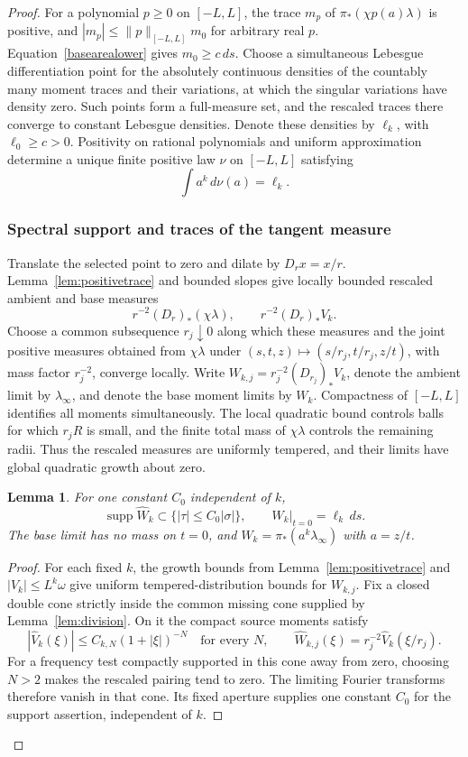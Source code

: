 \documentclass[11pt]{article}
\newtheorem{lemma}[theorem]{Lemma}
\newcommand{\supp}{\operatorname{supp}}
\begin{document}
\begin{proof}
For a polynomial $p\ge0$ on $[-L,L]$, the trace $m_p$ of $\pi_*(\chi p(a)\lambda)$ is positive, and
$|m_p|\le\|p\|_{[-L,L]}m_0$ for arbitrary real $p$. Equation~\eqref{basearealower} gives $m_0\ge c\,ds$. Choose a simultaneous Lebesgue differentiation point for the absolutely continuous densities of the countably many moment traces and their variations, at which the singular variations have density zero. Such points form a full-measure set, and the rescaled traces there converge to constant Lebesgue densities. Denote these densities by $\ell_k$, with $\ell_0\ge c>0$. Positivity on rational polynomials and uniform approximation determine a unique finite positive law $\nu$ on $[-L,L]$ satisfying
\begin{equation}\label{lawdefinition}
 \int a^k\,d\nu(a)=\ell_k.
\end{equation}

\subsubsection{Spectral support and traces of the tangent measure}
Translate the selected point to zero and dilate by $D_r x=x/r$. Lemma~\ref{lem:positivetrace} and bounded slopes give locally bounded rescaled ambient and base measures
\[
 r^{-2}(D_r)_*(\chi\lambda),\qquad r^{-2}(D_r)_*V_k.
\]
Choose a common subsequence $r_j\downarrow0$ along which these measures and the joint positive measures obtained from $\chi\lambda$ under $(s,t,z)\mapsto(s/r_j,t/r_j,z/t)$, with mass factor $r_j^{-2}$, converge locally. Write $W_{k,j}=r_j^{-2}(D_{r_j})_*V_k$, denote the ambient limit by $\lambda_\infty$, and denote the base moment limits by $W_k$. Compactness of $[-L,L]$ identifies all moments simultaneously. The local quadratic bound controls balls for which $r_jR$ is small, and the finite total mass of $\chi\lambda$ controls the remaining radii. Thus the rescaled measures are uniformly tempered, and their limits have global quadratic growth about zero.

\begin{lemma}\label{lem:tangentcone}
For one constant $C_0$ independent of $k$,
\begin{equation}\label{tangentcone}
 \supp\widehat W_k\subset\{ |\tau|\le C_0|\sigma|\},
 \qquad W_k|_{t=0}=\ell_k\,ds.
\end{equation}
The base limit has no mass on $t=0$, and
$W_k=\pi_*(a^k\lambda_\infty)$ with $a=z/t$.
\end{lemma}
\begin{proof}
For each fixed $k$, the growth bounds from Lemma~\ref{lem:positivetrace} and $|V_k|\le L^k\omega$ give uniform tempered-distribution bounds for $W_{k,j}$. Fix a closed double cone strictly inside the common missing cone supplied by Lemma~\ref{lem:division}. On it the compact source moments satisfy
\[
 |\widehat V_k(\xi)|\le C_{k,N}(1+|\xi|)^{-N}
 \quad\text{for every }N,
 \qquad
 \widehat W_{k,j}(\xi)=r_j^{-2}\widehat V_k(\xi/r_j).
\]
For a frequency test compactly supported in this cone away from zero, choosing $N>2$ makes the rescaled pairing tend to zero. The limiting Fourier transforms therefore vanish in that cone. Its fixed aperture supplies one constant $C_0$ for the support assertion, independent of $k$.


\end{proof}
\end{proof}
\end{document}
